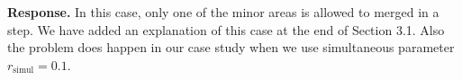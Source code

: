 \documentclass[a4paper,twoside,11pt]{reviewresponse}
\begin{document}
\textbf{Response.}
In this case, only one of the minor areas is allowed to merged in a step.
We have added an explanation of this case at the end of Section 3.1.
Also the problem does happen in our case study 
when we use simultaneous parameter $r_\mathrm{simul}=0.1$.









\printbibliography
	
\end{document}
